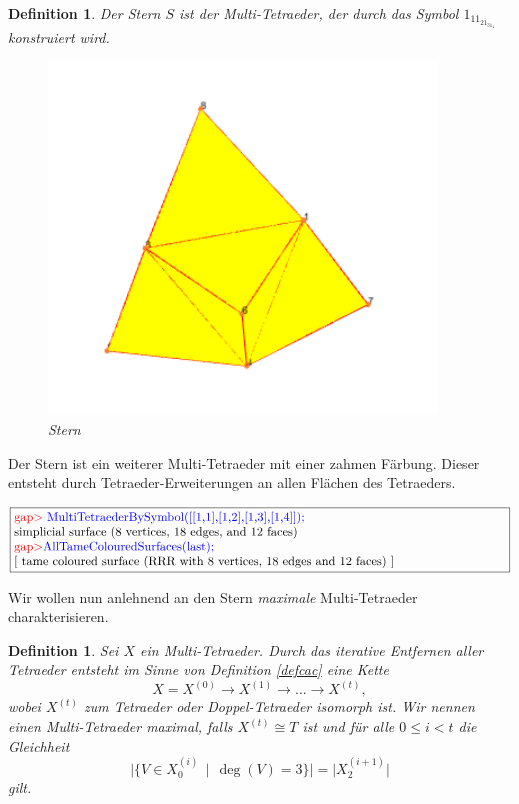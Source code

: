 \documentclass[12pt,titlepage,twoside,cleardoublepage]{article}
\theoremstyle{nummermitklammern}
\newtheorem{definition}[temp]{Definition}
\newtheorem{definition}[zahl]{Definition}
\numberwithin{equation}{section}
\begin{document}
\begin{definition}
Der \emph{Stern} $S$ ist der Multi-Tetraeder, der durch das Symbol $1_11_21_31_4$ konstruiert wird.
\begin{figure}[H]
\begin{center}
\includegraphics[scale=0.7,viewport=0cm 2.5cm 8cm 8cm]{star}
\end{center}
\caption{Stern}
\end{figure}
\end{definition}
Der Stern ist ein weiterer Multi-Tetraeder mit einer zahmen Färbung. Dieser entsteht durch Tetraeder-Erweiterungen an allen Flächen des Tetraeders. 
\begin{center}
$\fbox{\parbox{14cm}{
\textcolor{red}{gap$>$} \textcolor{blue}{MultiTetraederBySymbol([[1,1],[1,2],[1,3],[1,4]]);}\newline
simplicial surface (8 vertices, 18 edges, and 12 faces)\newline
\textcolor{red}{gap$>$}\textcolor{blue}{ AllTameColouredSurfaces(last);}\newline
[ tame coloured surface (RRR with 8 vertices, 18 edges and 12 faces)
 ]
}}$
\end{center}
Wir wollen nun anlehnend an den Stern \emph{maximale} Multi-Tetraeder charakterisieren.
\begin{definition}
Sei $X$ ein Multi-Tetraeder. Durch das iterative Entfernen aller Tetraeder entsteht im Sinne von Definition \ref{defcac} eine Kette 
\[
X=X^{(0)}\to X^{(1)}\to \ldots \to X^{(t)},
\]
wobei $X^{(t)}$ zum Tetraeder oder Doppel-Tetraeder isomorph ist.
Wir nennen einen Multi-Tetraeder \emph{maximal}, falls $X^{(t)}\cong T$ ist und für alle $0\leq i< t$ die Gleichheit
\[
\vert \{V\in X_0^{(i)}\,\mid \, \deg(V)=3\}\vert=\vert X^{(i+1)}_2\vert 
\]
gilt.
\end{definition}
\end{document}
